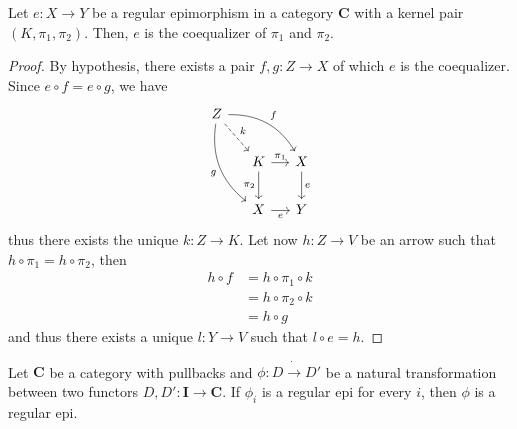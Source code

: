 \documentclass[runningheads,envcountsect]{lipics-v2021}
\newcommand{\cat}[1]{\ensuremath{\mathbf{#1}}}
\begin{document}
\begin{proposition}\label{prop:reg_epi_coeq}
    Let $e: X \to Y$ be a regular epimorphism in a category $\cat C$ with a kernel pair $(K, \pi_1, \pi_2)$. Then, $e$ is the coequalizer of $\pi_1$ and $\pi_2$.
\end{proposition}

\begin{proof}
    By hypothesis, there exists a pair $f, g: Z \to X$ of which $e$ is the coequalizer. Since $e \circ f = e \circ g$, we have
    \[
        \begin{tikzcd}[row sep= 20, column sep = 13]
            Z \ar[drr, "f", bend left=30] \ar[ddr, "g"swap, bend right=30] \ar[dr, dashed, "k"] & & \\
            & K \ar[r, "{\pi_1}"] \ar[d, "{\pi_2}" swap] & X \ar[d, "e"] \\
            & X \ar[r, "e"swap] & Y
        \end{tikzcd}
    \]
    thus there exists the unique $k: Z \to K$. Let now $h: Z \to V$ be an arrow such that $h \circ \pi_1 = h \circ \pi_2$, then
    \begin{align*}
        h \circ f &= h \circ \pi_1 \circ k \\
                  &= h \circ \pi_2 \circ k \\
                  &= h \circ g
    \end{align*}
    and thus there exists a unique $l: Y \to V$ such that $l \circ e = h$.   
\end{proof}

\begin{corollary}\label{cor:reg_epi_components_reg_epi_nat_trans}
    Let $\cat C$ be a category with pullbacks and $\phi : D \dot\to D'$ be a natural transformation between two functors $D, D': \cat{I \to C}$. If $\phi_i$ is a regular epi for every $i$, then $\phi$ is a regular epi.
\end{corollary}
\end{document}
